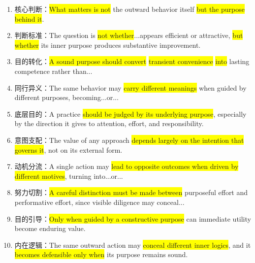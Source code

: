 ﻿\documentclass[lang=cn,11pt]{elegantbook}
\begin{document}
\begin{enumerate}
    \item 核心判断：\colorbox{yellow}{What matters is not} the outward behavior itself \colorbox{yellow}{but the purpose behind it}.
    \item 判断标准：The question is \colorbox{yellow}{not whether}...appears efficient or attractive, \colorbox{yellow}{but whether} its inner purpose produces substantive improvement.
    \item 目的转化：\colorbox{yellow}{A sound purpose should convert} \colorbox{yellow}{transient convenience} \colorbox{yellow}{into} lasting competence rather than...
    \item 同行异义：The same behavior may \colorbox{yellow}{carry different meanings} when guided by different purposes, becoming...or...
    \item 底层目的：A practice \colorbox{yellow}{should be judged by its underlying purpose}, especially by the direction it gives to attention, effort, and responsibility.
    \item 意图支配：The value of any approach \colorbox{yellow}{depends largely on the intention that governs it}, not on its external form.
    \item 动机分流：A single action may \colorbox{yellow}{lead to opposite outcomes when driven by different motives}, turning into...or...
    \item 努力切割：\colorbox{yellow}{A careful distinction must be made between} purposeful effort and performative effort, since visible diligence may conceal...
    \item 目的引导：\colorbox{yellow}{Only when guided by a constructive purpose} can immediate utility become enduring value.
    \item 内在逻辑：The same outward action may \colorbox{yellow}{conceal different inner logics}, and it \colorbox{yellow}{becomes defensible only when} its purpose remains sound.
\end{enumerate}
\end{document}
